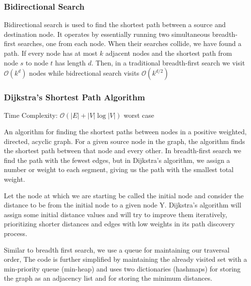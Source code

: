 \documentclass{article}
\newcommand{\bigO}{\mathcal{O}}
\begin{document}
    \subsubsection{Bidirectional Search}
    Bidirectional search is used to find the shortest path between a source and destination node. It operates by essentially running two simultaneous breadth-first searches, one from each node. When their searches collide, we have found a path.  If every node has at most $k$ adjacent nodes and the shortest path from node $s$ to node $t$ has length $d$. Then, in a traditional breadth-first search we visit $\mathcal{O}(k^d)$ nodes while bidrectional search visits $\mathcal{O}(k^{d/2})$

    \subsubsection{Dijkstra's Shortest Path Algorithm}
    Time Complexity: $\bigO (|E|+|V|\log |V|)$ worst case
    
    An algorithm for finding the shortest paths between nodes in a positive weighted, directed, acyclic graph. For a given source node in the graph, the algorithm finds the shortest path between that node and every other. In breadth-first search we find the path with the fewest edges, but in Dijkstra’s algorithm, we assign a number or weight to each segment, giving us the path with the smallest total weight.
    
    Let the node at which we are starting be called the initial node and consider the distance to be from the initial node to a given node Y. Dijkstra's algorithm will assign some initial distance values and will try to improve them iteratively, prioritizing shorter distances and edges with low weights in its path discovery process.
    
    Similar to breadth first search, we use a queue for maintaining our traversal order, The code is further simplified by maintaining the already visited set with a min-priority queue (min-heap) and uses two dictionaries (hashmaps) for storing the graph as an adjacency list and for storing the minimum distances.
    
\end{document}
